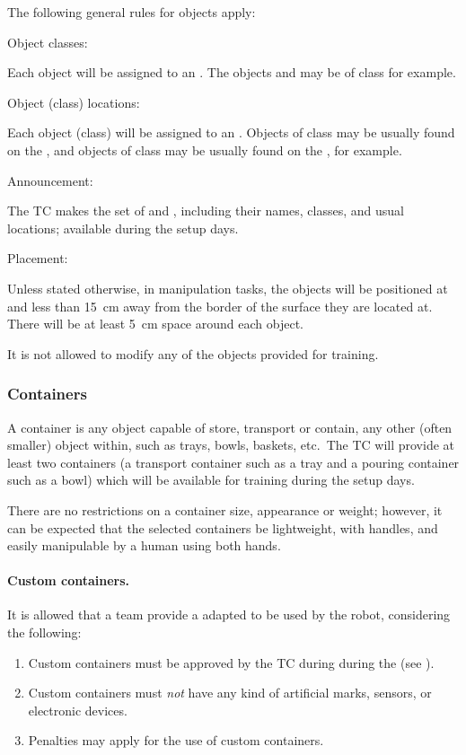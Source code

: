 The following general rules for objects apply:

\begin{enumerate}
	{\bf\item Object classes:} Each object will be assigned to an . The objects  and  may be of class  for example.

	{\bf\item Object (class) locations:} Each object (class) will be assigned to an . Objects of class  may be usually found on the , and objects of class  may be usually found on the , for example.

	{\bf\item Announcement:} The TC makes the set of  and , including their names, classes, and usual locations; available during the setup days. 
	
	{\bf\item Placement:}  Unless stated otherwise, in manipulation tasks, the objects will be positioned at  and less than \SI{15}{\centi\meter} away from the border of the surface they are located at. There will be at least \SI{5}{\centi\meter} space around each object.
\end{enumerate}

It is not allowed to modify any of the objects provided for training.

\subsubsection{Containers}
A container is any object capable of store, transport or contain, any other (often smaller) object within, such as trays, bowls, baskets, etc.~The TC will provide at least two containers (a transport container such as a tray and a pouring container such as a bowl) which will be available for training during the setup days.

There are no restrictions on a container size, appearance or weight; however, it can be expected that the selected containers be lightweight, with handles, and easily manipulable by a human using both hands.

\paragraph*{Custom containers.} It is allowed that a team provide a  adapted to be used by the robot, considering the following:
\begin{enumerate}
	\item Custom containers must be approved by the TC during during the  (see ).
	\item Custom containers must \emph{not} have any kind of artificial marks, sensors, or electronic devices.
	\item Penalties may apply for the use of custom containers.
\end{enumerate}

